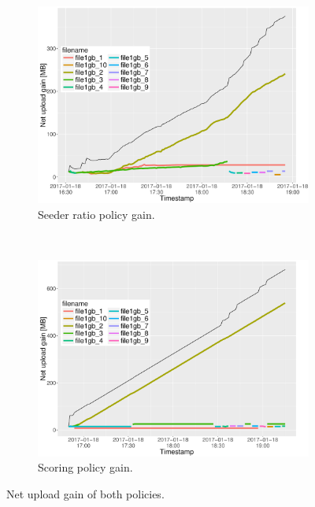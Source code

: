 \begin{figure}[h!]
	\begin{adjustwidth}{-1.5cm}{}
		\begin{subfigure}[t]{0.6\textwidth}
			\centering
			\includegraphics[width=\textwidth]{pics/results/simple1_sr_notrig.pdf}
			\caption{Seeder ratio policy gain.}
			\label{fig:simplesrnotrig}
		\end{subfigure}
		~
		\begin{subfigure}[t]{0.6\textwidth}
			\centering
			\includegraphics[width=\textwidth]{pics/results/simple1_scsr_notrig.pdf}
			\caption{Scoring policy gain.}
			\label{fig:simplescsrnotrig}
		\end{subfigure}
		\caption{Net upload gain of both policies.}
	\end{adjustwidth}
\end{figure} 

